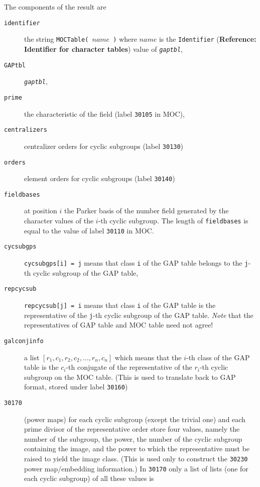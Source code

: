 \documentclass[a4paper,11pt]{report}
\begin{document}
{{{ The components of the result are 
\begin{description}
\item[{\texttt{identifier}}]  the string \texttt{MOCTable( }$name$\texttt{ )} where $name$ is the \texttt{Identifier} (\textbf{Reference: Identifier for character tables}) value of \mbox{\texttt{\mdseries\slshape gaptbl}}, 
\item[{\texttt{GAPtbl}}]  \mbox{\texttt{\mdseries\slshape gaptbl}}, 
\item[{\texttt{prime}}]  the characteristic of the field (label \texttt{30105} in \textsf{MOC}), 
\item[{\texttt{centralizers}}]  centralizer orders for cyclic subgroups (label \texttt{30130}) 
\item[{\texttt{orders}}]  element orders for cyclic subgroups (label \texttt{30140}) 
\item[{\texttt{fieldbases}}]  at position $i$ the Parker basis of the number field generated by the character values of the $i$-th cyclic subgroup. The length of \texttt{fieldbases} is equal to the value of label \texttt{30110} in \textsf{MOC}. 
\item[{\texttt{cycsubgps}}]  \texttt{cycsubgps[i] = j} means that class \texttt{i} of the \textsf{GAP} table belongs to the \texttt{j}-th cyclic subgroup of the \textsf{GAP} table, 
\item[{\texttt{repcycsub}}]  \texttt{repcycsub[j] = i} means that class \texttt{i} of the \textsf{GAP} table is the representative of the \texttt{j}-th cyclic subgroup of the \textsf{GAP} table. \emph{Note} that the representatives of \textsf{GAP} table and \textsf{MOC} table need not agree! 
\item[{\texttt{galconjinfo}}]  a list $[ r_1, c_1, r_2, c_2, \ldots, r_n, c_n ]$ which means that the $i$-th class of the \textsf{GAP} table is the $c_i$-th conjugate of the representative of the $r_i$-th cyclic subgroup on the \textsf{MOC} table. (This is used to translate back to \textsf{GAP} format, stored under label \texttt{30160}) 
\item[{\texttt{30170}}]  (power maps) for each cyclic subgroup (except the trivial one) and each prime
divisor of the representative order store four values, namely the number of
the subgroup, the power, the number of the cyclic subgroup containing the
image, and the power to which the representative must be raised to yield the
image class. (This is used only to construct the \texttt{30230} power map/embedding information.) In \texttt{30170} only a list of lists (one for each cyclic subgroup) of all these values is

\end{description}}}}
\end{document}
